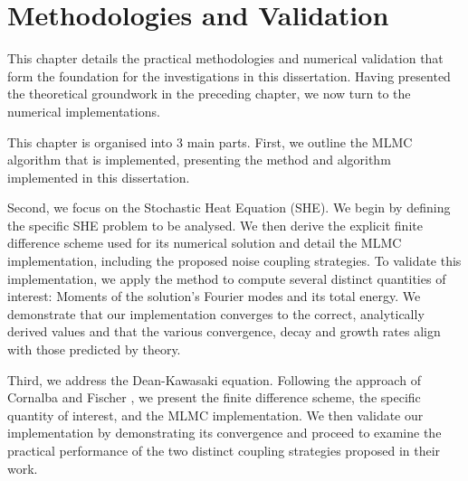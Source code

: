 \chapter{Methodologies and Validation}\label{chap:method_and_validation}

This chapter details the practical methodologies and numerical validation 
that form the foundation for the investigations in this dissertation. Having 
presented the theoretical groundwork in the preceding chapter, we now 
turn to the numerical implementations.

This chapter is organised into 3 main parts. First, 
we outline the MLMC algorithm that is implemented, 
presenting the method and algorithm 
implemented in this dissertation.

Second, we focus on the Stochastic Heat Equation (SHE). We begin
by defining the specific SHE problem to be analysed.
We then derive the explicit finite difference scheme 
used for its numerical solution and detail the MLMC implementation,
including the proposed noise coupling strategies. To validate 
this implementation, we apply the method to compute several 
distinct quantities of interest: Moments of the solution's
Fourier modes and its total energy. We demonstrate that our 
implementation converges to the correct, analytically 
derived values and that the various convergence, decay and 
growth rates align with those predicted by theory.

Third, we address the Dean-Kawasaki equation. Following 
the approach of Cornalba and Fischer \cite{cornalba2025multilevel}, 
we present the finite difference scheme, the specific quantity
of interest, and the MLMC implementation. We then validate our implementation
by demonstrating its convergence and proceed to examine the 
practical performance of the two distinct coupling 
strategies proposed in their work. 



